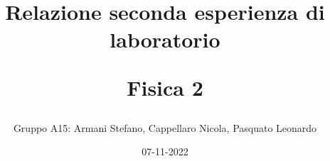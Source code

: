 %
%
%



\documentclass{article}
\usepackage{amsmath}
\usepackage{setspace}
\usepackage{anysize}
\usepackage{geometry}
\usepackage{epsfig}
\usepackage{graphicx}

\title{\huge Relazione seconda esperienza di laboratorio \par Fisica 2}
\author{Gruppo A15: Armani Stefano, Cappellaro Nicola, Pasquato Leonardo}
\date{07-11-2022}
\setlength{\parindent}{0cm}


    \maketitle
    \rule{\linewidth}{0.1mm}

    \section{Scopo dell'esperienza}
    Lo scopo della seconda esperienza di laboratorio è stato quello di prendere confidenza
    con due dei principali strumenti utilizzabili nello studio di una rete circuitale:
    il generatore di forme d'onda e l'oscilloscopio.\par
    Per comprendere al meglio il loro funzionamento e l'utilizzo, sono stati applicati
    ad un semplice circuito RC, a cui sono state date in ingresso diverse forme d'onda e 
    sono state studiate le risposte della rete a tali ingressi grazie all'oscilloscopio. 
    
